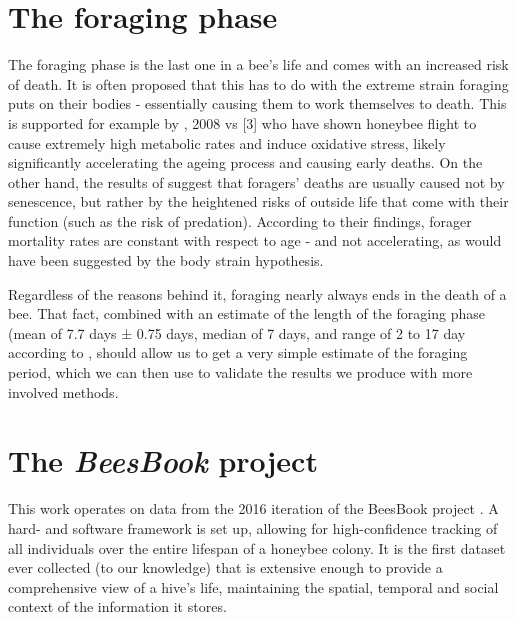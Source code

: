 \section{The foraging phase}
The foraging phase is the last one in a bee’s life and comes with an increased
risk of death. It is often proposed that this has to do with the extreme strain
foraging puts on their bodies - essentially causing them to work themselves to
death. This is supported for example by \citep{williams_age_2008}, %
2008 vs [3] who have shown honeybee flight to cause extremely high metabolic
rates and induce oxidative stress, likely significantly accelerating the ageing
process and causing early deaths. On the other hand, the results of
\citep{visscher_survivorship_1997} suggest that foragers’ deaths are usually
caused not by senescence, but rather by the heightened risks of outside life
that come with their function (such as the risk of predation). According to
their findings, forager mortality rates are constant with respect to age - and
not accelerating, as would have been suggested by the body strain hypothesis. 

Regardless of the reasons behind it, foraging nearly always ends in the death of
a bee. That fact, combined with an estimate of the length of the foraging phase
(mean of 7.7 days ± 0.75 days, median of 7 days, and range of 2 to 17 day
according to \citep{visscher_survivorship_1997}, should allow us to get a very
simple estimate of the foraging period, which we can then use to validate the
results we produce with more involved methods.



\section{The \textit{BeesBook} project}
This work operates on data from the 2016 iteration of the BeesBook project
\citep{wario_automatic_2015}. A hard- and software framework is set up, allowing
for high-confidence tracking of all individuals over the entire lifespan of a
honeybee colony. It is the first dataset ever collected (to our knowledge) that
is extensive enough to provide a comprehensive view of a hive’s life,
maintaining the spatial, temporal and social context of the information it
stores. 

